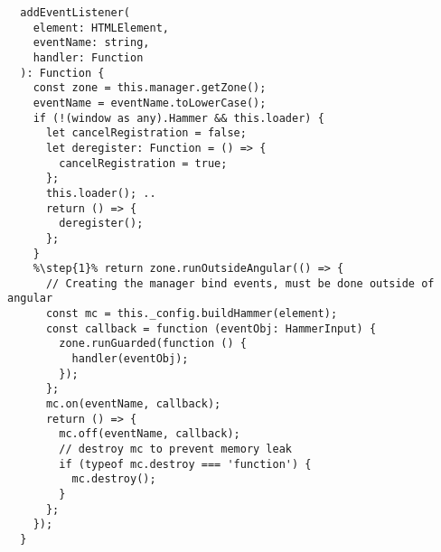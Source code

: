 \begin{verbatim}
  addEventListener(
    element: HTMLElement,
    eventName: string,
    handler: Function
  ): Function {
    const zone = this.manager.getZone();
    eventName = eventName.toLowerCase();
    if (!(window as any).Hammer && this.loader) {
      let cancelRegistration = false;
      let deregister: Function = () => {
        cancelRegistration = true;
      };
      this.loader(); ..
      return () => {
        deregister();
      };
    }
    %\step{1}% return zone.runOutsideAngular(() => {
      // Creating the manager bind events, must be done outside of angular
      const mc = this._config.buildHammer(element);
      const callback = function (eventObj: HammerInput) {
        zone.runGuarded(function () {
          handler(eventObj);
        });
      };
      mc.on(eventName, callback);
      return () => {
        mc.off(eventName, callback);
        // destroy mc to prevent memory leak
        if (typeof mc.destroy === 'function') {
          mc.destroy();
        }
      };
    });
  }
\end{verbatim}
